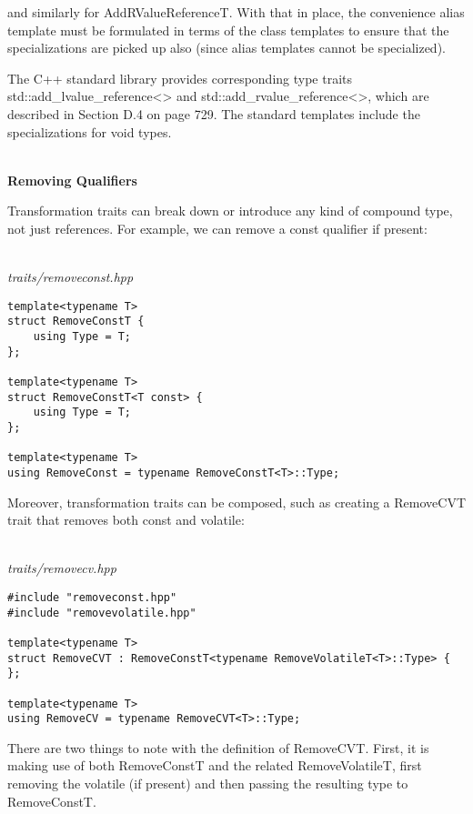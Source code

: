 and similarly for AddRValueReferenceT. With that in place, the convenience alias template must be formulated in terms of the class templates to ensure that the specializations are picked up also (since alias templates cannot be specialized).

The C++ standard library provides corresponding type traits std::add\_lvalue\_reference<> and std::add\_rvalue\_reference<>, which are described in Section D.4 on page 729. The standard templates include the specializations for void types.

\hspace*{\fill} \\ %
\noindent
\textbf{Removing Qualifiers}

Transformation traits can break down or introduce any kind of compound type, not just references. For example, we can remove a const qualifier if present:

\hspace*{\fill} \\ %
\noindent
\textit{traits/removeconst.hpp}
\begin{lstlisting}[style=styleCXX]
template<typename T>
struct RemoveConstT {
	using Type = T;
};

template<typename T>
struct RemoveConstT<T const> {
	using Type = T;
};

template<typename T>
using RemoveConst = typename RemoveConstT<T>::Type;
\end{lstlisting}

Moreover, transformation traits can be composed, such as creating a RemoveCVT trait that removes both const and volatile:

\hspace*{\fill} \\ %
\noindent
\textit{traits/removecv.hpp}
\begin{lstlisting}[style=styleCXX]
#include "removeconst.hpp"
#include "removevolatile.hpp"

template<typename T>
struct RemoveCVT : RemoveConstT<typename RemoveVolatileT<T>::Type> {
};

template<typename T>
using RemoveCV = typename RemoveCVT<T>::Type;
\end{lstlisting}

There are two things to note with the definition of RemoveCVT. First, it is making use of both RemoveConstT and the related RemoveVolatileT, first removing the volatile (if present) and then passing the resulting type to RemoveConstT.

